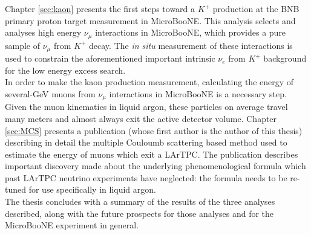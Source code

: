 Chapter \ref{sec:kaon} presents the first steps toward a $K^+$ production at the BNB primary proton target measurement in MicroBooNE. This analysis selects and analyses high energy $\nu_\mu$ interactions in MicroBooNE, which provides a pure sample of $\nu_\mu$ from $K^+$ decay. The \textit{in situ} measurement of these interactions is used to constrain the aforementioned important intrinsic $\nu_e$ from $K^+$ background for the low energy excess search.\\

In order to make the kaon production measurement, calculating the energy of several-GeV muons from $\nu_\mu$ interactions in MicroBooNE is a necessary step. Given the muon kinematics in liquid argon, these particles on average travel many meters and almost always exit the active detector volume. Chapter \ref{sec:MCS} presents a publication (whose first author is the author of this thesis) describing in detail the multiple Couloumb scattering based method used to estimate the energy of muons which exit a LArTPC. The publication describes important discovery made about the underlying phenomenological formula which past LArTPC neutrino experiments have neglected: the formula needs to be re-tuned for use specifically in liquid argon.\\

The thesis concludes with a summary of the results of the three analyses described, along with the future prospects for those analyses and for the MicroBooNE experiment in general.



